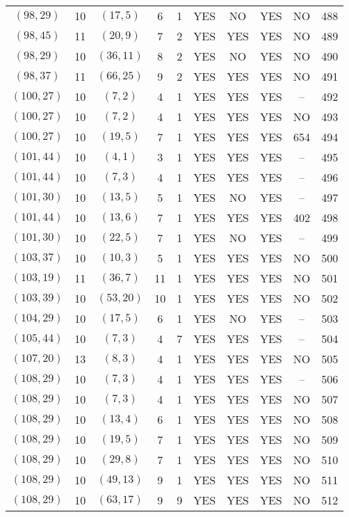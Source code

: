 \begin{longtable}{|c|c|c|c|c|c|c|c|c|c|}
$(98, 29)$ & 10 & $(17, 5)$ & 6 & 1 & YES & NO & YES & NO & 488\\
$(98, 45)$ & 11 & $(20, 9)$ & 7 & 2 & YES & YES & YES & NO & 489\\
$(98, 29)$ & 10 & $(36, 11)$ & 8 & 2 & YES & NO & YES & NO & 490\\
$(98, 37)$ & 11 & $(66, 25)$ & 9 & 2 & YES & YES & YES & NO & 491\\
$(100, 27)$ & 10 & $(7, 2)$ & 4 & 1 & YES & YES & YES & -- & 492\\
$(100, 27)$ & 10 & $(7, 2)$ & 4 & 1 & YES & YES & YES & NO & 493\\
$(100, 27)$ & 10 & $(19, 5)$ & 7 & 1 & YES & YES & YES & 654 & 494\\
$(101, 44)$ & 10 & $(4, 1)$ & 3 & 1 & YES & YES & YES & -- & 495\\
$(101, 44)$ & 10 & $(7, 3)$ & 4 & 1 & YES & YES & YES & -- & 496\\
$(101, 30)$ & 10 & $(13, 5)$ & 5 & 1 & YES & NO & YES & -- & 497\\
$(101, 44)$ & 10 & $(13, 6)$ & 7 & 1 & YES & YES & YES & 402 & 498\\
$(101, 30)$ & 10 & $(22, 5)$ & 7 & 1 & YES & NO & YES & -- & 499\\
$(103, 37)$ & 10 & $(10, 3)$ & 5 & 1 & YES & YES & YES & NO & 500\\
$(103, 19)$ & 11 & $(36, 7)$ & 11 & 1 & YES & YES & YES & NO & 501\\
$(103, 39)$ & 10 & $(53, 20)$ & 10 & 1 & YES & YES & YES & NO & 502\\
$(104, 29)$ & 10 & $(17, 5)$ & 6 & 1 & YES & NO & YES & -- & 503\\
$(105, 44)$ & 10 & $(7, 3)$ & 4 & 7 & YES & YES & YES & -- & 504\\
$(107, 20)$ & 13 & $(8, 3)$ & 4 & 1 & YES & YES & YES & NO & 505\\
$(108, 29)$ & 10 & $(7, 3)$ & 4 & 1 & YES & YES & YES & -- & 506\\
$(108, 29)$ & 10 & $(7, 3)$ & 4 & 1 & YES & YES & YES & NO & 507\\
$(108, 29)$ & 10 & $(13, 4)$ & 6 & 1 & YES & YES & YES & NO & 508\\
$(108, 29)$ & 10 & $(19, 5)$ & 7 & 1 & YES & YES & YES & NO & 509\\
$(108, 29)$ & 10 & $(29, 8)$ & 7 & 1 & YES & YES & YES & NO & 510\\
$(108, 29)$ & 10 & $(49, 13)$ & 9 & 1 & YES & YES & YES & NO & 511\\
$(108, 29)$ & 10 & $(63, 17)$ & 9 & 9 & YES & YES & YES & NO & 512\\

\end{longtable}
